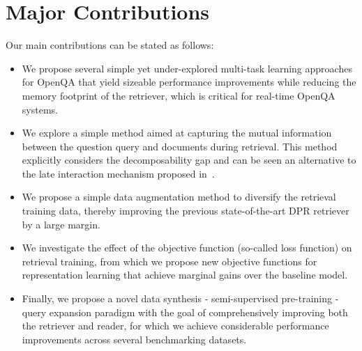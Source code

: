 \section{Major Contributions}\label{sec:contribution}
Our main contributions can be stated as follows:
\begin{itemize}
\item
%
We propose several simple yet under-explored multi-task learning approaches for OpenQA that yield sizeable performance improvements while reducing the memory footprint of the retriever, which is critical for real-time OpenQA systems.

\item
%
We explore a simple method aimed at capturing the mutual information between the question query and documents during retrieval.
%
This method explicitly considers the decomposability gap and can be seen an alternative to the late interaction mechanism proposed in~\citet{khattab2020colbert}.

\item
%
We propose a simple data augmentation method to diversify the retrieval training data, thereby improving the previous state-of-the-art DPR retriever by a large margin.

\item
%
We investigate the effect of the objective function (so-called loss function) on retrieval training, from which we propose new objective functions for representation learning that achieve marginal gains over the baseline model.

\item
%
Finally, we propose a novel data synthesis - semi-supervised pre-training - query expansion paradigm with the goal of comprehensively improving both the retriever and reader, for which we achieve considerable performance improvements across several benchmarking datasets.


\end{itemize}


%

%
%
%
%
%
%

